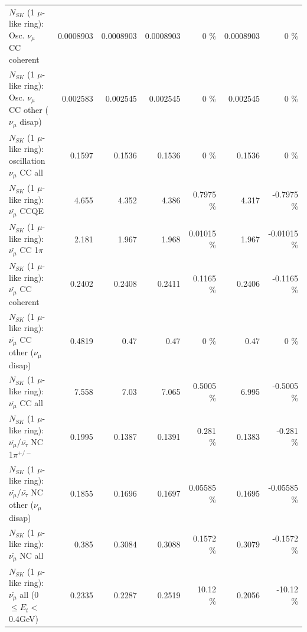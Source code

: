 \begin{table}
\begin{tabular}{| l | r | r | r  r | r  r |}
                        $N_{SK}$ (1 $\mu$-like ring): Osc. $\nu_\mu$ CC coherent &       0.0008903 &       0.0008903 &       0.0008903 &        0 \%  &       0.0008903 &        0 \%  \\ 
         $N_{SK}$ (1 $\mu$-like ring): Osc. $\nu_\mu$ CC other ($\nu_\mu$ disap) &        0.002583 &        0.002545 &        0.002545 &        0 \%  &        0.002545 &        0 \%  \\ 
                      $N_{SK}$ (1 $\mu$-like ring): oscillation $\nu_\mu$ CC all &          0.1597 &          0.1536 &          0.1536 &        0 \%  &          0.1536 &        0 \%  \\ 
\hline
\hline
                              $N_{SK}$ (1 $\mu$-like ring): $\bar{\nu_\mu}$ CCQE &           4.655 &           4.352 &           4.386 &   0.7975 \%  &           4.317 &  -0.7975 \%  \\ 
                         $N_{SK}$ (1 $\mu$-like ring): $\bar{\nu_\mu}$ CC 1$\pi$ &           2.181 &           1.967 &           1.968 &  0.01015 \%  &           1.967 & -0.01015 \%  \\ 
                       $N_{SK}$ (1 $\mu$-like ring): $\bar{\nu_\mu}$ CC coherent &          0.2402 &          0.2408 &          0.2411 &   0.1165 \%  &          0.2406 &  -0.1165 \%  \\ 
        $N_{SK}$ (1 $\mu$-like ring): $\bar{\nu_\mu}$ CC other ($\nu_\mu$ disap) &          0.4819 &            0.47 &            0.47 &        0 \%  &            0.47 &        0 \%  \\ 
                          $N_{SK}$ (1 $\mu$-like ring): $\bar{\nu_{\mu}}$ CC all &           7.558 &            7.03 &           7.065 &   0.5005 \%  &           6.995 &  -0.5005 \%  \\ 
\hline
  $N_{SK}$ (1 $\mu$-like ring): $\bar{\nu_\mu}$/$\bar{\nu_\tau}$ NC 1$\pi^{+/-}$ &          0.1995 &          0.1387 &          0.1391 &    0.281 \%  &          0.1383 &   -0.281 \%  \\ 
$N_{SK}$ (1 $\mu$-like ring): $\bar{\nu_\mu}$/$\bar{\nu_\tau}$ NC other ($\nu_\mu$ disap) &          0.1855 &          0.1696 &          0.1697 &  0.05585 \%  &          0.1695 & -0.05585 \%  \\ 
                          $N_{SK}$ (1 $\mu$-like ring): $\bar{\nu_{\mu}}$ NC all &           0.385 &          0.3084 &          0.3088 &   0.1572 \%  &          0.3079 &  -0.1572 \%  \\ 
\hline
   $N_{SK}$ (1 $\mu$-like ring): $\bar{\nu_{\mu}}$ all (0 $\leq E_{t} <$ 0.4GeV) &          0.2335 &          0.2287 &          0.2519 &    10.12 \%  &          0.2056 &   -10.12 \%  \\ 

\end{tabular}
\end{table}
